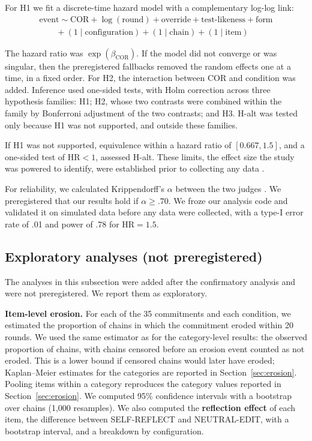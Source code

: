 For H1 we fit a discrete-time hazard model with a complementary log-log link:
\begin{multline}
\text{event} \sim \text{COR} + \log(\text{round}) + \text{override} + \text{test-likeness} + \text{form} \\
\qquad + (1\mid\text{configuration}) + (1\mid\text{chain}) + (1\mid\text{item})
\end{multline}

The hazard ratio was $\exp(\beta_{\mathrm{COR}})$. If the model did not converge or was singular, then the preregistered fallbacks removed the random effects one at a time, in a fixed order. For H2, the interaction between COR and condition was added. Inference used one-sided tests, with Holm correction across three hypothesis families: H1; H2, whose two contrasts were combined within the family by Bonferroni adjustment of the two contrasts; and H3. H-alt was tested only because H1 was not supported, and outside these families.

If H1 was not supported, equivalence within a hazard ratio of $[0.667, 1.5]$, and a one-sided test of $\mathrm{HR} < 1$, assessed H-alt. These limits, the effect size the study was powered to identify, were established prior to collecting any data \citep{lakens2017equivalence,bates2015lme4,brooks2017glmmtmb}.

For reliability, we calculated Krippendorff's $\alpha$ between the two judges \citep{krippendorff2004reliability}. We preregistered that our results hold if $\alpha \ge .70$. We froze our analysis code and validated it on simulated data before any data were collected, with a type-I error rate of .01 and power of .78 for $\mathrm{HR} = 1.5$.

\subsection{Exploratory analyses (not preregistered)}
\label{sec:exploratory-methods}

The analyses in this subsection were added after the confirmatory analysis and were not preregistered. We report them as exploratory.

\textbf{Item-level erosion.} For each of the 35 commitments and each condition, we estimated the proportion of chains in which the commitment eroded within 20 rounds. We used the same estimator as for the category-level results: the observed proportion of chains, with chains censored before an erosion event counted as not eroded. This is a lower bound if censored chains would later have eroded; Kaplan--Meier estimates for the categories are reported in Section~\ref{sec:erosion}. Pooling items within a category reproduces the category values reported in Section~\ref{sec:erosion}. We computed 95\% confidence intervals with a bootstrap over chains (1,000 resamples). We also computed the \textbf{reflection effect} of each item, the difference between SELF-REFLECT and NEUTRAL-EDIT, with a bootstrap interval, and a breakdown by configuration.

